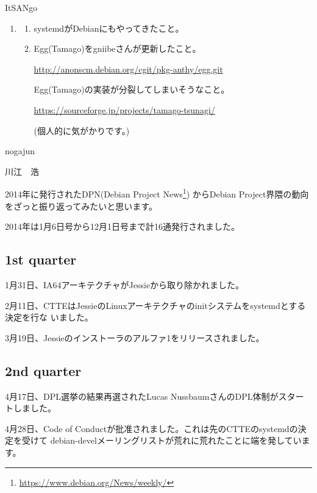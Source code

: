 \documentclass[mingoth,a4paper]{jsarticle}
\begin{document}
\begin{prework}{ ItSANgo }
  \begin{enumerate}
  \item
    \begin{enumerate}
    \item systemdがDebianにもやってきたこと。
    \item Egg(Tamago)をgniibeさんが更新したこと。

      \url{http://anonscm.debian.org/cgit/pkg-anthy/egg.git}

      Egg(Tamago)の実装が分裂してしまいそうなこと。

      \url{https://sourceforge.jp/projects/tamago-tsunagi/}

      (個人的に気がかりです。)
    \end{enumerate}
  \end{enumerate}
\end{prework}

\begin{prework}{ nogajun }
\end{prework}

\begin{prework}{ 川江　浩 }
\end{prework}


2014年に発行されたDPN(Debian Project News\footnote{\url{https://www.debian.org/News/weekly/}})
からDebian Project界隈の動向をざっと振り返ってみたいと思います。

2014年は1月6日号から12月1日号まで計16通発行されました。

\subsection{1st quarter}

1月31日、IA64アーキテクチャがJessieから取り除かれました。

2月11日、CTTEはJessieのLinuxアーキテクチャのinitシステムをsystemdとする決定を行な
いました。

3月19日、Jessieのインストーラのアルファ1をリリースされました。

\subsection{2nd quarter}
4月17日、DPL選挙の結果再選されたLucas NussbaumさんのDPL体制がスタートしました。

4月28日、Code of Conductが批准されました。これは先のCTTEのsystemdの決定を受けて
debian-develメーリングリストが荒れに荒れたことに端を発しています。
\end{document}
